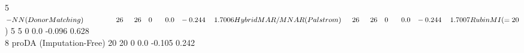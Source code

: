 \documentclass[11pt,oneside]{book}
\begin{document}
\begin{routput}
5 $-NN (Donor Matching) \hspace*{4.5em}26 \hspace*{1.5em}26 \hspace*{1em}0 \hspace*{1.8em}0.0 \hspace*{0.8em}-0.244 \hspace*{1.2em}1.700\\
6 Hybrid MAR/MNAR (Palstr{\\o}m) \hspace*{1.5em}26 \hspace*{1.5em}26 \hspace*{1em}0 \hspace*{1.8em}0.0 \hspace*{0.8em}-0.244 \hspace*{1.2em}1.700\\
7 Rubin MI (=20$) \hspace*{6.5em}5 \hspace*{2em}5 \hspace*{1em}0 \hspace*{1.8em}0.0 \hspace*{0.8em}-0.096 \hspace*{1.2em}0.628\\
8 proDA (Imputation-Free) \hspace*{3.5em}20 \hspace*{1.5em}20 \hspace*{1em}0 \hspace*{1.8em}0.0 \hspace*{0.8em}-0.105 \hspace*{1.2em}0.242
\end{routput}
\end{document}
